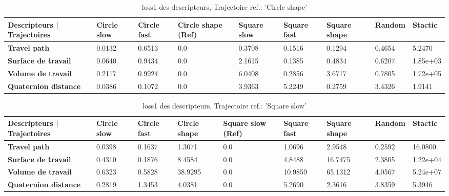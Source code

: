 \documentclass[5pt]{article}
\begin{document}
\begin{table}[H]
    \centering
    \begin{tabularx}{\textwidth}{|p{}|X|X|X|X|X|X|X|X|}
    \rowcolor{lightgray}
        \hline
        Descripteurs | Trajectoires &  Circle slow & Circle fast  & \cellcolor[HTML]{238CCC} \textbf{Circle shape (Ref)} & Square slow & Square fast & Square shape & Random & Stactic \\ \hline
        \textbf{Travel path} & 0.0132 & 0.6513 & 0.0 & 0.3708 & 0.1516 & 0.1294 & 0.4654 & 5.2470 \\ \hline
        \textbf{Surface de travail} & 0.0640 & 0.9434 & 0.0 & 2.1615 & 0.1385 & 0.4834 & 0.6207 & 1.85e+03 \\ \hline
        \textbf{Volume de travail} & 0.2117 & 0.9924 & 0.0 & 6.0408 & 0.2856 & 3.6717 & 0.7805 & 1.72e+05 \\ \hline
        \textbf{Quaternion distance} & 0.0386 & 0.1072 & 0.0 & 3.9363 & 5.2249 & 0.2759 & 3.4326 & 1.9141 \\ \hline  
    \end{tabularx}
        \caption{loss1 des descripteurs, Trajectoire ref.: 'Circle shape'}
\end{table}

\begin{table}[H]
    \centering
    \begin{tabularx}{\textwidth}{|p{}|X|X|X|X|X|X|X|X|}
    \rowcolor{lightgray}
        \hline
        Descripteurs | Trajectoires &  Circle slow & Circle fast  &  Circle shape  & \cellcolor[HTML]{238CCC} \textbf{Square slow (Ref)} & Square fast & Square shape & Random & Stactic \\ \hline
        \textbf{Travel path} & 0.0398 & 0.1637 & 1.3071 & 0.0 & 1.0696 & 2.9548 & 0.2592 & 16.0800 \\ \hline
        \textbf{Surface de travail} & 0.4310 & 0.1876 & 8.4584 & 0.0 & 4.8488 & 16.7475 & 2.3805 & 1.22e+04 \\ \hline
        \textbf{Volume de travail} & 0.6323 & 0.5828 & 38.9295 & 0.0 & 10.9859 & 65.1312 & 4.0567 & 5.24e+07 \\ \hline
        \textbf{Quaternion distance} & 0.2819 & 1.3453 & 4.0381 & 0.0 & 5.2690 & 2.3616 & 3.8359 & 5.3946 \\ \hline  
    \end{tabularx}
        \caption{loss1 des descripteurs, Trajectoire ref.: 'Square slow'}
\end{table}
\end{document}
